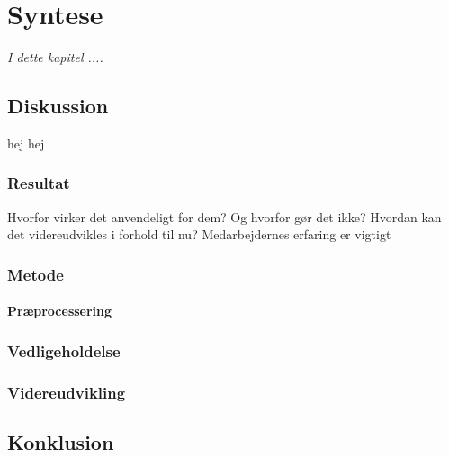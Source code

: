 \chapter{Syntese}
\textit{I dette kapitel ....}

\section{Diskussion}
hej hej
\subsection{Resultat}
Hvorfor virker det anvendeligt for dem? Og hvorfor gør det ikke? Hvordan kan det videreudvikles i forhold til nu? Medarbejdernes erfaring er vigtigt

\subsection{Metode}

\subsubsection{Præprocessering}

\subsection{Vedligeholdelse}

\subsection{Videreudvikling}


\section{Konklusion}

